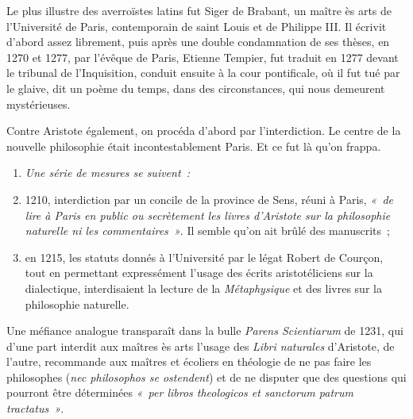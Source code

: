 \documentclass[french,twoside]{book} %
\newlength{\listmod}
\newcommand{\listhead}[1]{\hspace{-1\listmod}\emph{#1}}
\begin{document}
\begin{listalpha}[itemsep=\baselineskip,]
\item Le plus illustre des averroïstes latins fut Siger de Brabant, un maître ès arts de l’Université de Paris, contemporain de saint Louis et de Philippe III. Il écrivit d’abord assez librement, puis après une double condamnation de ses thèses, en 1270 et 1277, par l’évêque de Paris, Etienne Tempier, fut traduit en 1277 devant le tribunal de l’Inquisition, conduit ensuite à la cour pontificale, où il fut tué par le glaive, dit un poème du temps, dans des circonstances, qui nous demeurent mystérieuses.
\label{p120}\item  Contre Aristote également, on procéda d’abord par l’interdiction. Le centre de la nouvelle philosophie était incontestablement Paris. Et ce fut là qu’on frappa.\par
 
\begin{enumerate}[itemsep=0pt,]
\item[]\listhead{Une série de mesures se suivent :}
\item  1210, interdiction par un concile de la province de Sens, réuni à Paris, \emph{« de lire à Paris en public ou secrètement les livres d’Aristote sur la philosophie naturelle ni les commentaires »}. Il semble qu’on ait brûlé des manuscrits ;
\item en 1215, les statuts donnés à l’Université par le légat Robert de Courçon, tout en permettant expressément l’usage des écrits aristotéliciens sur la dialectique, interdisaient la lecture de la {\itshape Métaphysique} et des livres sur la philosophie naturelle.
\end{enumerate}

 Une méfiance analogue transparaît dans la bulle {\itshape Parens Scientiarum} de 1231, qui d’une part interdit aux maîtres ès arts l’usage des {\itshape Libri naturales} d’Aristote, de l’autre, recommande aux maîtres et écoliers en théologie de ne pas faire les philosophes ({\itshape nec philosophos se ostendent}) et de ne disputer que des questions qui pourront être déterminées \emph{« per libros theologicos et sanctorum patrum tractatus »}.
 
\end{listalpha}
\end{document}
